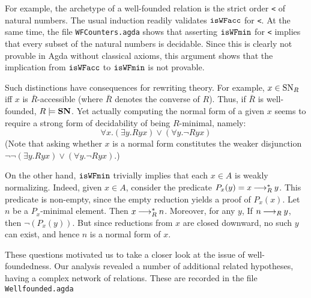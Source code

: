 For example, the archetype of a well-founded relation is the strict order \verb|<|
of natural numbers.  The usual induction readily validates $\mathtt{isWFacc}$ for \verb|<|.
  At the same time, the file \texttt{WFCounters.agda} shows that
asserting $\mathtt{isWFmin}$ for \verb|<| implies that every subset of the natural numbers is decidable.  Since this is clearly not provable in Agda without classical axioms,
this argument shows that the implication from $\mathtt{isWFacc}$ to $\mathtt{isWFmin}$ is not provable.

Such distinctions have consequences for rewriting theory.
For example, $x\in \mathrm{SN}_R$ iff $x$ is $\bar{R}$-accessible (where $\bar{R}$ denotes
the converse of $R$).  Thus, if $\bar{R}$ is well-founded, $R \models \mathbf{SN}$.
Yet actually computing the normal form of a given $x$ seems to require a
strong form of decidability of being $R$-minimal, namely:
\[
\tag{$\isMinDec$} \forall x. \left(\exists y. Ryx\right) \lor \left(\forall y. \lnot Ryx\right)
\]
(Note that asking whether $x$ is a normal form constitutes the weaker disjunction
$\lnot\lnot\left(\exists y. Ryx\right) \lor \left(\forall y. \lnot Ryx\right)$.)

On the other hand, $\mathtt{isWFmin}$ trivially implies that each $x \in A$ is weakly normalizing.
Indeed, given $x \in A$, consider the predicate $P_x(y) = x \mathbin{\longrightarrow_R^*} y$.
This predicate is non-empty, since the empty reduction yields a proof of $P_x(x)$.
Let $n$ be a $P_x$-minimal element.  Then $x \mathbin{\longrightarrow_R^*} n$.  Moreover, for any $y$,
If $n \mathbin{\longrightarrow_R} y$, then $\lnot(P_x(y))$.  But since reductions from $x$ are closed downward,
no such $y$ can exist, and hence $n$ is a normal form of $x$.

%
These questions motivated us to take a closer look at the issue of well-foundedness.
Our analysis revealed a number of additional related hypotheses, having a complex
network of relations.  %
These are recorded in the file \verb|Wellfounded.agda|
